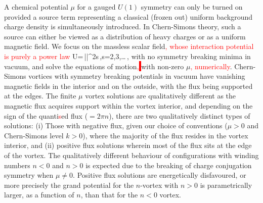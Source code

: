 A chemical potential $\mu$ for a gauged $U(1)$ symmetry  can only be turned on provided a source term representing a classical (frozen out) uniform background charge density is simultaneously introduced. In Chern-Simons theory, such a source can either be viewed as a distribution of heavy charges or as a uniform magnetic field. We focus on the massless scalar field\textcolor{red}{, whose interaction potential is purely a power law}
\be 
U=\,|\Phi|^{2s}\,,\qquad s=2,3,\ldots\,, \label{powerlawu}
\ee
 with no symmetry breaking minima in vacuum, and solve the equations of motion\textcolor{red}{,}\colorbox{red}{ } with non-zero $\mu$\textcolor{red}{,} \textcolor{red}{numerically}.  Chern-Simons vortices with symmetry breaking potentials in vacuum have vanishing magnetic fields in the interior and on the outside, with the flux being supported at the edges. The finite $\mu$ vortex solutions are qualitatively different as the magnetic flux acquires support within the vortex interior, and depending on the sign of the quanti\textcolor{red}{s}ed flux ($=2\pi n$), there are two qualitatively distinct types of solutions: (i) Those with negative flux, given our choice of conventions ($\mu>0$ and Chern-Simons level $k>0$), where the majority of the flux resides in the vortex interior, and (ii) positive flux solutions wherein most of the flux sits at the edge of the vortex. The qualitatively different behaviour of configurations with winding numbers $n<0$ and $n>0$ is expected due to the breaking of charge conjugation symmetry when $\mu\neq 0$.  Positive flux solutions are energetically disfavoured, or more precisely the grand potential for the $n$-vortex with $n>0$ is parametrically larger, as a function of $n$, than that for the $n<0$ vortex. 
 
